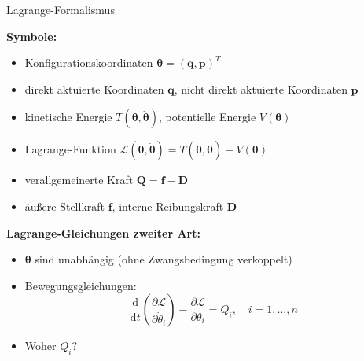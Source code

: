 \documentclass[
	ngerman,
	10pt,				%
	aspectratio=169, 	%
	xcolor=dvipsnames
]{beamer}
\begin{document}
\begin{frame}[t,fragile,label=Lagrange2_1]{\large Lagrange-Formalismus}
	
	\textbf{Symbole:}
	\begin{itemize}
		\item Konfigurationskoordinaten $\boldsymbol{\theta} = (\mathbf{q}, \mathbf{p})^T$
		\pause
		\item direkt aktuierte Koordinaten $\mathbf{q}$, nicht direkt aktuierte Koordinaten $\mathbf{p}$
		\pause
		\item kinetische Energie $T(\boldsymbol{\theta}, \dot{\boldsymbol{\theta}})$, potentielle Energie $V(\boldsymbol{\theta})$
		\pause
		\item Lagrange-Funktion $\mathcal{L}(\boldsymbol{\theta}, \dot{\boldsymbol{\theta}}) = T(\boldsymbol{\theta}, \dot{\boldsymbol{\theta}}) - V(\boldsymbol{\theta})$
		\pause
		\item verallgemeinerte Kraft $\mathbf{Q} = \mathbf{f} - \mathbf{D}$
		\pause
		\item äußere Stellkraft $\mathbf{f}$, interne Reibungskraft $\mathbf{D}$
	\end{itemize}
	
	\pause
	\bigskip
	\textbf{Lagrange-Gleichungen zweiter Art:}
	\begin{itemize}
		\pause
		\item  $\boldsymbol{\theta}$ sind unabhängig (ohne Zwangsbedingung verkoppelt)
		\pause
		\item Bewegungsgleichungen:
		\begin{equation*}
			\frac{\mathrm{d}}{\mathrm{d} t} \left(\frac{\partial \mathcal{L}}{\partial \dot{\theta}_i} \right) - \frac{\partial \mathcal{L}}{\partial \theta_i} = Q_i, \quad i = 1, \ldots, n
		\end{equation*}
		\pause
		\item Woher $Q_i$?
	\end{itemize}
	
\end{frame}

\end{document}
